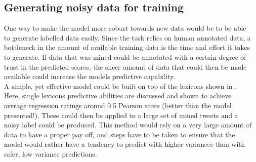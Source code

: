 \subsection{Generating noisy data for training}
One way to make the model more robust towards new data would be to be able to generate labelled data easily. Since the task relies on human annotated data, a bottleneck in the amount of available training data is the time and effort it takes to generate. If data that was mined could be annotated with a certain degree of trust in the predicted scores, the sheer amount of data that could then be made available could increase the models predictive capability.\\
A simple, yet effective model could be built on top of the lexicons shown in \cite{wassa2017}. Here, single lexicons predictive abilities are discussed and shown to achieve average regression ratings around 0.5 Pearson score (better than the model presented!). These could then be applied to a large set of mined tweets and a noisy label could be produced. This method would rely on a very large amount of data to have a proper pay off, and steps have to be taken to ensure that the model would rather have a tendency to predict with higher variances than with safer, low variance predictions.